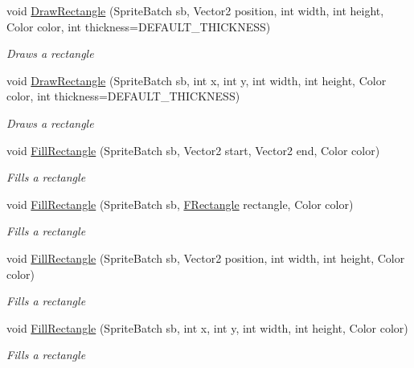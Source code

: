 \begin{DoxyCompactItemize}
void \hyperlink{class_hel_hel_project_1_1_tools_1_1_primitives2_d_aa722becf3d2aeaa426ecf988ee1490a9}{Draw\+Rectangle} (Sprite\+Batch sb, Vector2 position, int width, int height, Color color, int thickness=D\+E\+F\+A\+U\+L\+T\+\_\+\+T\+H\+I\+C\+K\+N\+E\+S\+S)
\begin{DoxyCompactList}\small\item\em Draws a rectangle \end{DoxyCompactList}\item 
void \hyperlink{class_hel_hel_project_1_1_tools_1_1_primitives2_d_a2a588f11a107c8505e356eeb6618e463}{Draw\+Rectangle} (Sprite\+Batch sb, int x, int y, int width, int height, Color color, int thickness=D\+E\+F\+A\+U\+L\+T\+\_\+\+T\+H\+I\+C\+K\+N\+E\+S\+S)
\begin{DoxyCompactList}\small\item\em Draws a rectangle \end{DoxyCompactList}\item 
void \hyperlink{class_hel_hel_project_1_1_tools_1_1_primitives2_d_a5867dc1ff83ff402ec56fb8a99706745}{Fill\+Rectangle} (Sprite\+Batch sb, Vector2 start, Vector2 end, Color color)
\begin{DoxyCompactList}\small\item\em Fills a rectangle \end{DoxyCompactList}\item 
void \hyperlink{class_hel_hel_project_1_1_tools_1_1_primitives2_d_a51046b8579a69b67cfccef8e7ad06477}{Fill\+Rectangle} (Sprite\+Batch sb, \hyperlink{class_hel_project_1_1_tools_1_1_f_rectangle}{F\+Rectangle} rectangle, Color color)
\begin{DoxyCompactList}\small\item\em Fills a rectangle \end{DoxyCompactList}\item 
void \hyperlink{class_hel_hel_project_1_1_tools_1_1_primitives2_d_a3f313f2307607889bf6da41a19e0fce5}{Fill\+Rectangle} (Sprite\+Batch sb, Vector2 position, int width, int height, Color color)
\begin{DoxyCompactList}\small\item\em Fills a rectangle \end{DoxyCompactList}\item 
void \hyperlink{class_hel_hel_project_1_1_tools_1_1_primitives2_d_ab590323efe1843b5ec4509cfaa2425be}{Fill\+Rectangle} (Sprite\+Batch sb, int x, int y, int width, int height, Color color)
\begin{DoxyCompactList}\small\item\em Fills a rectangle \end{DoxyCompactList}\end{DoxyCompactItemize}
